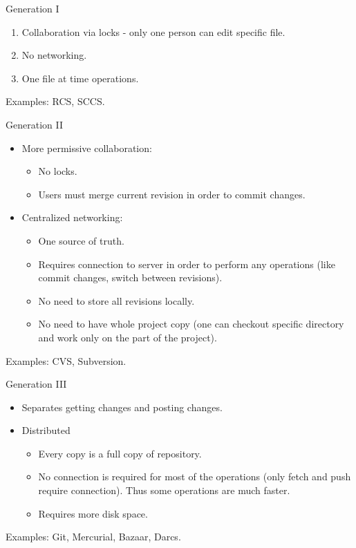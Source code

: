 \documentclass[presentation,aspectratio=169,smaller]{beamer}
\begin{document}
\begin{frame}[label={sec:org0ec5684}]{Generation I}
\begin{enumerate}
\item Collaboration via locks - only one person can edit specific file.
\item No networking.
\item One file at time operations.
\end{enumerate}

Examples: RCS, SCCS.
\end{frame}

\begin{frame}[label={sec:orga044fd1}]{Generation II}
\begin{itemize}
\item More permissive collaboration:
\begin{itemize}
\item No locks.
\item Users must merge current revision in order to commit changes.
\end{itemize}
\item Centralized networking:
\begin{itemize}
\item One source of truth.
\item Requires connection to server in order to perform any operations (like
commit changes, switch between revisions).
\item No need to store all revisions locally.
\item No need to have whole project copy (one can checkout specific directory and
work only on the part of the project).
\end{itemize}
\end{itemize}

Examples: CVS, Subversion.
\end{frame}

\begin{frame}[label={sec:orgf879c4c}]{Generation III}
\begin{itemize}
\item Separates getting changes and posting changes.
\item Distributed
\begin{itemize}
\item Every copy is a full copy of repository.
\item No connection is required for most of the operations (only fetch and push
require connection). Thus some operations are much faster.
\item Requires more disk space.
\end{itemize}
\end{itemize}

Examples: Git, Mercurial, Bazaar, Darcs.
\end{frame}
\end{document}
